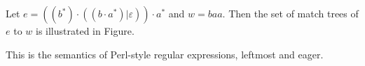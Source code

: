 
\begin{example}
Let $e = ((b^\ast) \cdot ((b \cdot a^\ast) | \varepsilon)) \cdot a^\ast$ and $w= baa$. Then the set of match trees of $e$ to $w$ is illustrated in Figure.
 \end{example}
  
  \begin{remark}
  This is the semantics of Perl-style regular expressions, leftmost and eager.
  \end{remark}
  
